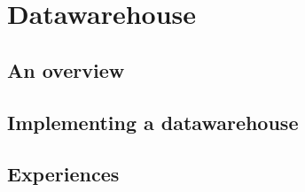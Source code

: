 \chapter{Datawarehouse}
\section{An overview}
\section{Implementing a datawarehouse}
\section{Experiences}